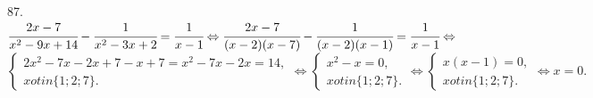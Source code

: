 87. $\cfrac{2x-7}{x^2-9x+14}-\cfrac{1}{x^2-3x+2}=\cfrac{1}{x-1}\Leftrightarrow
\cfrac{2x-7}{(x-2)(x-7)}-\cfrac{1}{(x-2)(x-1)}=\cfrac{1}{x-1}\Leftrightarrow$\\$
\begin{cases} 2x^2-7x-2x+7-x+7=x^2-7x-2x=14,\\
x
otin\{1;2;7\}.\end{cases}\Leftrightarrow
\begin{cases} x^2-x=0,\\
x
otin\{1;2;7\}.\end{cases}\Leftrightarrow
\begin{cases} x(x-1)=0,\\
x
otin\{1;2;7\}.\end{cases}\Leftrightarrow x=0.$\\
